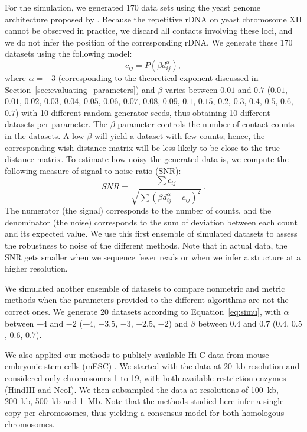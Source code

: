 For the simulation, we generated 170 data sets using the yeast genome
architecture proposed by \citet{duan:three}. Because the repetitive
rDNA on yeast chromosome XII cannot be observed in practice, we
discard all contacts involving these loci, and we do not infer the
position of the corresponding rDNA. We generate these 170 datasets
using the following model:
\begin{equation}\label{eq:simu}
c_{ij} = P(\beta d_{ij}^\alpha),
\end{equation}
where $\alpha = -3$ (corresponding to the theoretical exponent discussed in Section~\ref{sec:evaluating_parameters})
and $\beta$ varies between $0.01$ and $0.7$ ($0.01$, $0.01$, $0.02$, $0.03$,
$0.04$, $0.05$,
$0.06$, $0.07$, $0.08$, $0.09$, $0.1$, $0.15$, $0.2$, $0.3$, $0.4$, $0.5$, $0.6$,
$0.7$) with 10
different random generator seeds, thus obtaining 10 different datasets per
parameter.
The $\beta$ parameter controls the number of contact counts in the
datasets. A low $\beta$ will yield a dataset with few counts; hence, the
corresponding wish distance matrix will be less likely to be close to the true
distance matrix. To estimate how noisy the generated data is, we compute the
following measure of signal-to-noise ratio (SNR):
\begin{equation}
SNR = \frac{\sum{c_{ij}}}{\sqrt{\sum (\beta d_{ij} ^{\alpha} - c_{ij})^2}}\,.
\end{equation}
The numerator (the signal) corresponds to the number of counts, and
the denominator (the noise) corresponds to the sum of deviation
between each count and its expected value.  We use this first ensemble
of simulated datasets to assess the robustness to noise of the
different methods. Note that in actual data, the SNR gets smaller when we sequence fewer reads or when we infer a structure at a higher resolution.

We simulated another ensemble of datasets to compare nonmetric and metric
methods when the parameters provided to the different algorithms are not
the correct ones. We generate 20 datasets according to
Equation~\ref{eq:simu}, with $\alpha$ between $-4$ and $-2$ ($-4$, $-3.5$,
$-3$, $-2.5$, $-2$) and $\beta$ between
$0.4$ and $0.7$ ($0.4$, $0.5$, $0.6$, $0.7$).

We also applied our methods to publicly available Hi-C data from mouse
embryonic stem cells (mESC) \citep{dixon:topological}.  We started with the
data at 20~kb resolution and considered only chromosomes 1 to 19, with both
available restriction enzymes (HindIII and NcoI).  We then subsampled the data
at resolutions of 100~kb, 200~kb, 500~kb and 1~Mb.
Note that the methods studied here infer a single copy per
chromosomes, thus yielding a consensus model for both homologous chromosomes.


